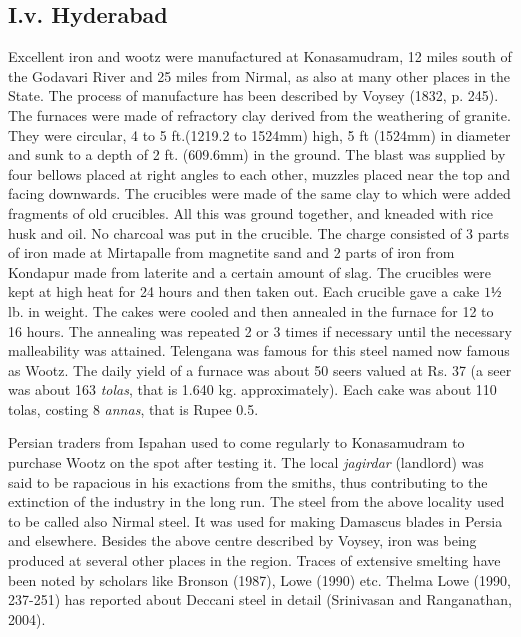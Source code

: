 \vspace{-.3cm}

\subsection*{I.v.  Hyderabad}\label{subsection-5}

\vspace{-.2cm}

Excellent iron and wootz were manufactured at Konasamudram, 12 miles south of the Godavari River and 25 miles from Nirmal, as also at many other places in the State. The process of manufacture has been described by Voysey (1832, p. 245). The furnaces were made of refractory clay derived from the weathering of granite.  They were circular, 4 to 5 ft.(1219.2 to 1524mm) high, 5 ft (1524mm) in diameter and sunk to a depth of 2 ft. (609.6mm) in the ground.  The blast was supplied by four bellows placed at right angles to each other, muzzles placed near the top and facing downwards.  The crucibles were made of the same clay to which were added fragments of old crucibles. All this was ground together, and kneaded with rice husk and oil. No charcoal was put in the crucible.  The charge consisted of 3 parts of iron made at Mirtapalle from magnetite sand and 2 parts of iron from Kondapur made from laterite and a certain amount of slag.  The crucibles were kept at high heat for 24 hours and then taken out.  Each crucible gave a cake $1½$ lb. in weight.  The cakes were cooled and then annealed in the furnace for 12 to 16 hours.  The annealing was repeated 2 or 3 times if necessary until the necessary malleability was attained.  Telengana was famous for this steel named   now famous as Wootz.  The daily yield of a furnace was about 50 seers valued at Rs. 37 (a seer was about 163 {\it tolas}, that is 1.640 kg. approximately). Each cake was about 110 tolas, costing 8 {\it annas}, that is Rupee 0.5.

Persian traders from Ispahan used to come regularly to Konasamudram to purchase Wootz on the spot after testing it.  The local {\it jagirdar} (landlord) was said to be rapacious in his exactions from the smiths, thus contributing to the extinction of the industry in the long run. The steel from the above locality used to be called also Nirmal steel. It was used for making Damascus blades in Persia and elsewhere. Besides the above centre described by Voysey, iron was being produced at several other places in the region. Traces of extensive smelting have been noted by scholars like Bronson (1987), Lowe (1990) etc. Thelma Lowe (1990, 237-251) has reported about Deccani steel in detail (Srinivasan and Ranganathan, 2004).   

